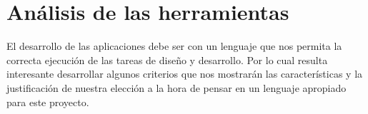 \documentclass[a4paper,12pt,openany,oneside]{book}
\begin{document}


\section{Análisis de las herramientas}
El desarrollo de las aplicaciones debe ser con un lenguaje que nos permita la correcta ejecución de las tareas de diseño y desarrollo. Por lo cual resulta interesante desarrollar algunos criterios que nos mostrarán las características y la justificación de nuestra elección a la hora de pensar en un lenguaje apropiado para este proyecto.
\end{document}
